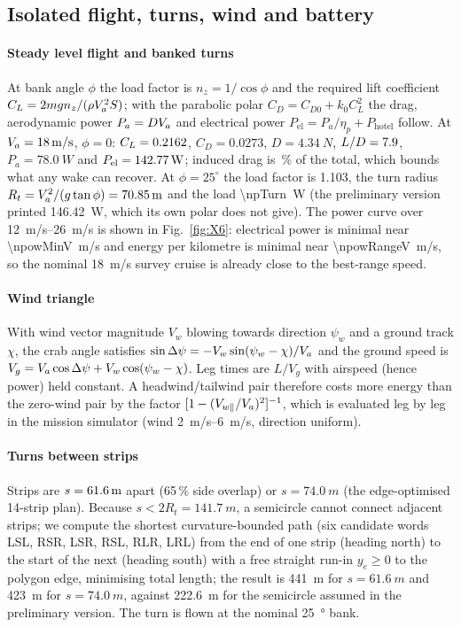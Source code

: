 \subsection{Isolated flight, turns, wind and battery}\label{sec:isolated}
\paragraph{Steady level flight and banked turns} At bank angle $\phi$ the load factor is $n_z=1/\cos\phi$ and the required lift coefficient $C_L=2mgn_z/(\rho V_a^2S)$; with the parabolic polar $C_D=C_{D0}+k_0C_L^2$ the drag, aerodynamic power $P_a=DV_a$ and electrical power $P_{\mathrm{el}}=P_a/\eta_p+P_{\mathrm{hotel}}$ follow. At $V_a=\SI{18}{m/s}$, $\phi=0$: $C_L=0.2162$, $C_D=0.0273$, $D=\SI{4.34}{N}$, $L/D=7.9$, $P_a=\SI{78.0}{W}$ and $P_{\mathrm{el}}=\SI{142.77}{W}$; induced drag is \ncdiShare\,\% of the total, which bounds what any wake can recover. At $\phi=25^\circ$ the load factor is 1.103, the turn radius $R_t=V_a^2/(g\tan\phi)=\SI{70.85}{m}$ and the load \SI{\npTurn}{W} (the preliminary version printed \SI{146.42}{W}, which its own polar does not give). The power curve over \SIrange{12}{26}{m/s} is shown in Fig.~\ref{fig:X6}: electrical power is minimal near \SI{\npowMinV}{m/s} and energy per kilometre is minimal near \SI{\npowRangeV}{m/s}, so the nominal \SI{18}{m/s} survey cruise is already close to the best-range speed.

\paragraph{Wind triangle} With wind vector magnitude $V_w$ blowing towards direction $\psi_w$ and a ground track $\chi$, the crab angle satisfies $\sin\Delta\psi=-V_w\sin(\psi_w-\chi)/V_a$ and the ground speed is $V_g=V_a\cos\Delta\psi+V_w\cos(\psi_w-\chi)$. Leg times are $L/V_g$ with airspeed (hence power) held constant. A headwind/tailwind pair therefore costs more energy than the zero-wind pair by the factor $[1-(V_{w\parallel}/V_a)^2]^{-1}$, which is evaluated leg by leg in the mission simulator (wind \SIrange{2}{6}{m/s}, direction uniform).

\paragraph{Turns between strips} Strips are $s=\SI{61.6}{m}$ apart (65\,\% side overlap) or $s=\SI{74.0}{m}$ (the edge-optimised 14-strip plan). Because $s<2R_t=\SI{141.7}{m}$, a semicircle cannot connect adjacent strips; we compute the shortest curvature-bounded path \cite{dubins1957} (six candidate words LSL, RSR, LSR, RSL, RLR, LRL) from the end of one strip (heading north) to the start of the next (heading south) with a free straight run-in $y_e\ge0$ to the polygon edge, minimising total length; the result is \SI{441}{m} for $s=\SI{61.6}{m}$ and \SI{423}{m} for $s=\SI{74.0}{m}$, against \SI{222.6}{m} for the semicircle assumed in the preliminary version. The turn is flown at the nominal \SI{25}{\degree} bank.

